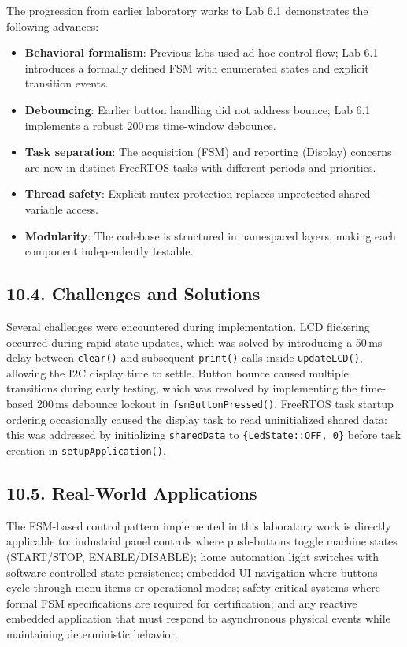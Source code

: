 \documentclass[12pt]{article}
\begin{document}
The progression from earlier laboratory works to Lab 6.1 demonstrates the following advances:

\begin{itemize}
    \item \textbf{Behavioral formalism}: Previous labs used ad-hoc control flow; Lab 6.1 introduces a formally defined FSM with enumerated states and explicit transition events.
    \item \textbf{Debouncing}: Earlier button handling did not address bounce; Lab 6.1 implements a robust 200\,ms time-window debounce.
    \item \textbf{Task separation}: The acquisition (FSM) and reporting (Display) concerns are now in distinct FreeRTOS tasks with different periods and priorities.
    \item \textbf{Thread safety}: Explicit mutex protection replaces unprotected shared-variable access.
    \item \textbf{Modularity}: The codebase is structured in namespaced layers, making each component independently testable.
\end{itemize}

\subsection*{10.4. Challenges and Solutions}

Several challenges were encountered during implementation. LCD flickering occurred during rapid state updates, which was solved by introducing a 50\,ms delay between \texttt{clear()} and subsequent \texttt{print()} calls inside \texttt{updateLCD()}, allowing the I2C display time to settle. Button bounce caused multiple transitions during early testing, which was resolved by implementing the time-based 200\,ms debounce lockout in \texttt{fsmButtonPressed()}. FreeRTOS task startup ordering occasionally caused the display task to read uninitialized shared data: this was addressed by initializing \texttt{sharedData} to \texttt{\{LedState::OFF, 0\}} before task creation in \texttt{setupApplication()}.

\subsection*{10.5. Real-World Applications}

The FSM-based control pattern implemented in this laboratory work is directly applicable to: industrial panel controls where push-buttons toggle machine states (START/STOP, ENABLE/DISABLE); home automation light switches with software-controlled state persistence; embedded UI navigation where buttons cycle through menu items or operational modes; safety-critical systems where formal FSM specifications are required for certification; and any reactive embedded application that must respond to asynchronous physical events while maintaining deterministic behavior.
\end{document}
